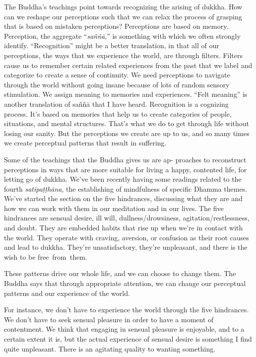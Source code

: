 The Buddha's teachings point towards recognizing the arising of dukkha. How can we reshape our perceptions such that we can relax the process of grasping that is based on mistaken perceptions? Perceptions are based on memory. Perception, the aggregate ``\emph{saññā},'' is something with which we often strongly identify. ``Recognition'' might be a better translation, in that all of our perceptions, the ways that we experience the world, are through filters. Filters cause us to remember certain related experiences from the past that we label and categorize to create a sense of continuity. We need perceptions to navigate through the world without going insane because of lots of random sensory stimulation. We assign meaning to memories and experiences. ``Felt meaning'' is another translation of saññā that I have heard. Recognition is a cognizing process. It's based on memories that help us to create categories of people, situations, and mental structures. That's what we do to get through life without losing our sanity. But the perceptions we create are up to us, and so many times we create perceptual patterns that result in suffering.

Some of the teachings that the Buddha gives us are ap- \linebreak proaches to reconstruct perceptions in ways that are more suitable for living a happy, contented life, for letting go of dukkha. We've been recently having some readings related to the fourth \emph{satipaṭṭhāna}, the establishing of mindfulness of specific Dhamma themes. We've started the section on the five hindrances, discussing what they are and how we can work with them in our meditation and in our lives. The five hindrances are sensual desire, ill will, dullness/drowsiness, agitation/restlessness, and doubt. They are embedded habits that rise up when we're in contact with the world. They operate with craving, aversion, or confusion as their root causes and lead to dukkha. They're unsatisfactory, they're unpleasant, and there is the wish to be \mbox{free from them.}

These patterns drive our whole life, and we can choose to change them. The Buddha says that through appropriate attention, we can change our perceptual patterns and our experience of the world.

For instance, we don't have to experience the world through the five hindrances. We don't have to seek sensual pleasure in order to have a moment of contentment. We think that engaging in sensual pleasure is enjoyable, and to a certain extent it is, but the actual experience of sensual desire is something I find quite unpleasant. There is an agitating quality to wanting something.


